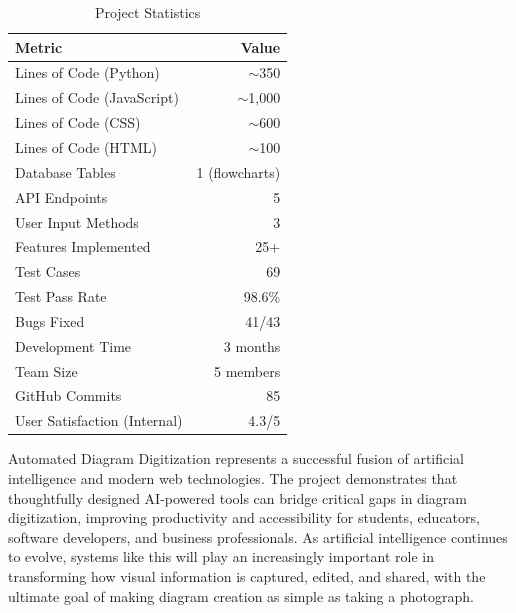 \begin{table}[!htbp]
\centering
\small
\renewcommand{\arraystretch}{1.25}
\begin{tabular}{|p{6cm}|r|}
    \hline
    \textbf{Metric} & \textbf{Value} \\
    \hline
    Lines of Code (Python)     & $\sim$350 \\
    \hline
    Lines of Code (JavaScript) & $\sim$1,000 \\
    \hline
    Lines of Code (CSS)        & $\sim$600 \\
    \hline
    Lines of Code (HTML)       & $\sim$100 \\
    \hline
    Database Tables            & 1 (flowcharts) \\
    \hline
    API Endpoints              & 5 \\
    \hline
    User Input Methods         & 3 \\
    \hline
    Features Implemented       & 25+ \\
    \hline
    Test Cases                 & 69 \\
    \hline
    Test Pass Rate             & 98.6\% \\
    \hline
    Bugs Fixed                 & 41/43 \\
    \hline
    Development Time           & 3 months \\
    \hline
    Team Size                  & 5 members \\
    \hline
    GitHub Commits             & 85 \\
    \hline
    User Satisfaction (Internal) & 4.3/5 \\
    \hline
\end{tabular}
\caption{Project Statistics}
\label{tab:project-stats}
\end{table}

Automated Diagram Digitization represents a successful fusion of artificial intelligence and modern web technologies. The project demonstrates that thoughtfully designed AI-powered tools can bridge critical gaps in diagram digitization, improving productivity and accessibility for students, educators, software developers, and business professionals. As artificial intelligence continues to evolve, systems like this will play an increasingly important role in transforming how visual information is captured, edited, and shared, with the ultimate goal of making diagram creation as simple as taking a photograph.